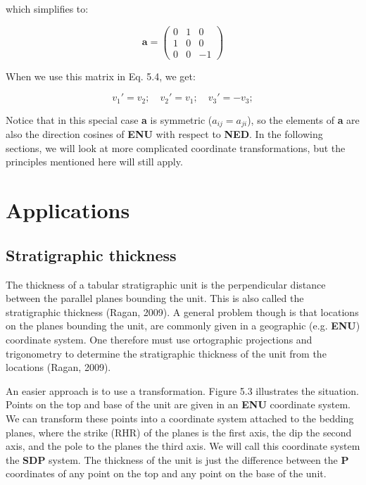 \documentclass[a4paper , 12pt]{book}
\begin{document}
which simplifies to:

\begin{equation}\label{eq5.7}
    \textbf{a}=
    \begin{pmatrix}
    0 & 1 & 0 \\
    1 & 0 & 0 \\
    0 & 0 & -1
\end{pmatrix}
\end{equation}

When we use this matrix in Eq. 5.4, we get:

\begin{equation}
    v_1\text{$'$}=v_2;\quad v_2\text{$'$}=v_1; \quad v_3\text{$'$}=-v_3;
\end{equation}

Notice that in this special case \textbf{a} is symmetric ($a_{ij}=a_{ji}$), so the elements of \textbf{a} are also the direction cosines of  \textbf{ENU} with respect to \textbf{NED}. In the following sections, we will look at more complicated coordinate transformations, but the principles mentioned here will still apply.

\section{Applications}

\subsection{Stratigraphic thickness}

The thickness of a tabular stratigraphic unit is the perpendicular distance between the parallel planes bounding the unit. This is also called the stratigraphic thickness (Ragan, 2009). A general problem though is that locations on the planes bounding the unit, are commonly given in a geographic (e.g. \textbf{ENU}) coordinate system. One therefore must use ortographic projections and trigonometry to determine the stratigraphic thickness of the unit from the locations (Ragan, 2009).

An easier approach is to use a transformation. Figure 5.3 illustrates the situation. Points on the top and base of the unit are given in an \textbf{ENU} coordinate system. We can transform these points into a coordinate system attached to the bedding planes, where the strike (RHR) of the planes is the first axis, the dip the second axis, and the pole to the planes the third axis. We will call this coordinate system the \textbf{SDP} system. The thickness of the unit is just the difference between the \textbf{P} coordinates of any point on the top  and any point on the base of the unit.
\end{document}
